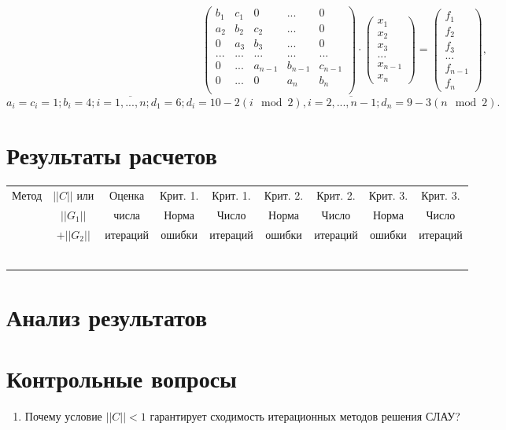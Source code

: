 \documentclass[12pt, a4paper]{article}
\begin{document}
\[
   \begin{pmatrix}
     b_1   &     c_1   &      0    &    ... & 0\\
     a_2 &     b_2   &      c_2    &   ... & 0\\
     0   &    a_3  &     b_3     &   ... & 0 \\
     ...   &    ...  &    ...     &   ... & ...\\ 
     0 & ...    &   a_{n-1}    &   b_{n-1}   &  c_{n-1} \\
     0 & ... & 0 & a_n & b_n\\
    \end{pmatrix} \cdot
    \begin{pmatrix}
 x_1\\
 x_2\\
x_3\\
...\\
x_{n-1}\\
x_n
    \end{pmatrix} =
\begin{pmatrix}
 f_1\\
 f_2\\
f_3\\
...\\
f_{n-1}\\
f_n
    \end{pmatrix},
\]
$a_i = c_i = 1; b_i = 4; i=\overline{1,...,n}; d_1 = 6; d_i = 10 - 2(i \mod 2), i = \overline{2,..., n-1}; d_n = 9 - 3(n \mod 2).$
\newpage

\section{Результаты расчетов}
\noindent\begin{center}
\begin{tabular}{|c|c|c|c|c|c|c|c|c|}
\hline
Метод & $||C||$ или  & Оценка  & Крит. 1.  & Крит. 1. & Крит. 2.  &Крит. 2. & Крит. 3.& Крит. 3.  \\
&$||G_1||$ & числа &Норма&  Число  & Норма & Число &  Норма& Число  \\
& $+ ||G_2||$ &итераций & ошибки &  итераций & ошибки & итераций &ошибки & итераций \\
\hline
&&&&&&&& \\
\hline
&&&&&&&&\\
\hline
&&&&&&&& \\
\hline
&&&&&&&& \\
\hline
&&&&&&&& \\
\hline
&&&&&&&& \\
\hline
\end{tabular}
\end{center}
\newpage

\section{Анализ результатов}
\newpage

\section{Контрольные вопросы}
\begin{enumerate}
\item Почему условие $||C|| < 1$ гарантирует сходимость итерационных методов решения СЛАУ?


\end{enumerate}
\newpage
\end{document}
